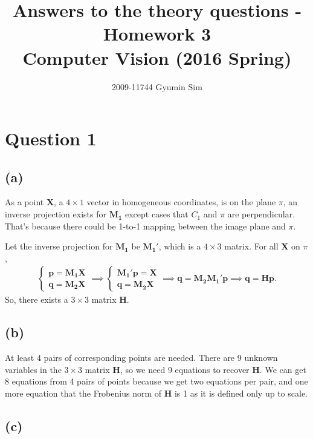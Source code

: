 \documentclass[a4paper,10pt]{article}
\begin{document}
\title{Answers to the theory questions - Homework 3 \\
  \large Computer Vision (2016 Spring)}
\author{2009-11744 Gyumin Sim}
\maketitle

\section*{Question 1}

\subsection*{(a)}

As a point $\bm{X}$, a $4 \times 1$ vector in homogeneous coordinates, is on the plane $\pi$,
an inverse projection exists for $\bm{M_1}$ except cases that $C_1$ and $\pi$ are perpendicular.
That's because there could be 1-to-1 mapping between the image plane and $\pi$.

Let the inverse projection for $\bm{M_1}$ be $\bm{M_1}'$, which is a $4 \times 3$ matrix.
For all $\bm{X}$ on $\pi$,
\begin{align*}
\begin{cases}
\bm{p} = \bm{M_1} \bm{X} \\
\bm{q} = \bm{M_2} \bm{X}
\end{cases}
\implies
\begin{cases}
\bm{M_1}' \bm{p} = \bm{X} \\
\bm{q} = \bm{M_2} \bm{X}
\end{cases}
\implies
\bm{q} = \bm{M_2} \bm{M_1}' \bm{p}
\implies
\bm{q} = \bm{H} \bm{p}.
\end{align*}
So, there exists a $3 \times 3$ matrix $\bm{H}$.

\subsection*{(b)}

At least 4 pairs of corresponding points are needed.
There are 9 unknown variables in the $3 \times 3$ matrix $\bm{H}$, so we need 9 equations to recover $\bm{H}$.
We can get 8 equations from 4 pairs of points because we get two equations per pair, and
one more equation that the Frobenius norm of $\bm{H}$ is 1 as it is defined only up to scale.

\subsection*{(c)}
\end{document}
